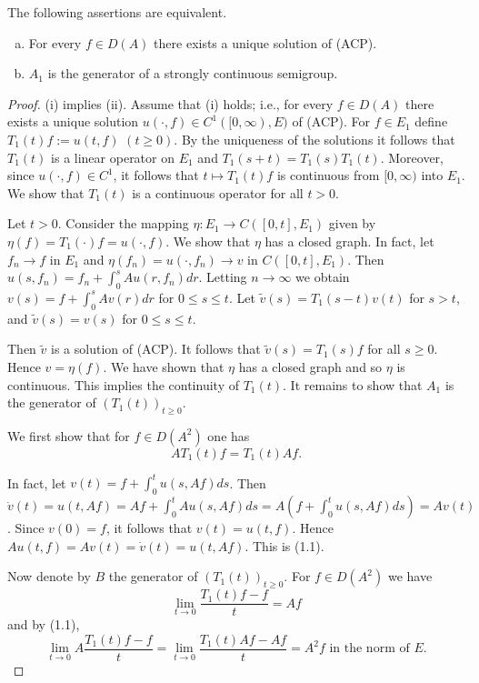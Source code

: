 \begin{theorem}\label{thm:1.1}
The following assertions are equivalent.
\begin{enumerate}[(a)]
\item For every $f \in D(A)$ there exists a unique solution of (ACP).
\item $A_{1}$ is the generator of a strongly continuous semigroup.
\end{enumerate}
\end{theorem}

\begin{proof}
(i) implies (ii).
Assume that (i) holds; i.e., for every $f \in D(A)$ there exists a unique solution $u(\cdot,f) \in C^{1}([0,\infty),E)$ of (ACP).
For $f \in E_{1}$ define $T_{1}(t)f := u(t,f)$ $(t\geq0)$.
By the uniqueness of the solutions it follows that $T_{1}(t)$ is a linear operator on $E_{1}$ and $T_{1}(s+t) = T_{1}(s)T_{1}(t)$.
Moreover, since $u(\cdot,f) \in C^{1}$, it follows that $t \mapsto T_{1}(t)f$ is continuous from $[0,\infty)$ into $E_{1}$.
We show that $T_{1}(t)$ is a continuous operator for all $t>0$.

Let $t>0$.
Consider the mapping $\eta: E_{1} \to C([0,t],E_{1})$ given by $\eta(f) = T_{1}(\cdot)f = u(\cdot,f)$.
We show that $\eta$ has a closed graph.
In fact, let $f_{n} \to f$ in $E_{1}$ and $\eta(f_{n}) = u(\cdot,f_{n}) \to v$ in $C([0,t],E_{1})$.
Then $u(s,f_{n}) = f_{n} + \int_0^s Au(r,f_{n})dr$.
Letting $n\to\infty$ we obtain $v(s) = f + \int_0^s Av(r)dr$ for $0 \leq s \leq t$.
Let $\tilde{v}(s) = T_{1}(s-t)v(t)$ for $s > t$, and $\tilde{v}(s) = v(s)$ for $0 \leq s \leq t$.

Then $\tilde{v}$ is a solution of (ACP).
It follows that $\tilde{v}(s) = T_{1}(s)f$ for all $s \geq 0$.
Hence $v = \eta(f)$.
We have shown that $\eta$ has a closed graph and so $\eta$ is continuous.
This implies the continuity of $T_{1}(t)$.
It remains to show that $A_{1}$ is the generator of $(T_{1}(t))_{t\geq0}$.

We first show that for $f \in D(A^{2})$ one has
\[
AT_{1}(t)f = T_{1}(t)Af. \tag{1.1}
\]

In fact, let $v(t) = f + \int_{0}^{t} u(s,Af) ds$.
Then $\dot{v}(t) = u(t,Af) = Af + \int_{0}^{t} Au(s,Af) ds = A(f + \int_{0}^{t} u(s,Af) ds) = Av(t)$.
Since $v(0) = f$, it follows that $v(t) = u(t,f)$.
Hence $Au(t,f) = Av(t) = \dot{v}(t) = u(t,Af)$.
This is (1.1).

Now denote by $B$ the generator of $(T_{1}(t))_{t\geq0}$.
For $f \in D(A^{2})$ we have
\[
\lim_{t \to 0} \frac{T_{1}(t)f - f}{t} = Af
\]
and by (1.1),
\[
\lim_{t \to 0} A \frac{T_{1}(t)f - f}{t} = \lim_{t \to 0} \frac{T_{1}(t)Af - Af}{t} = A^{2}f \text{ in the norm of } E.
\]


\end{proof}
